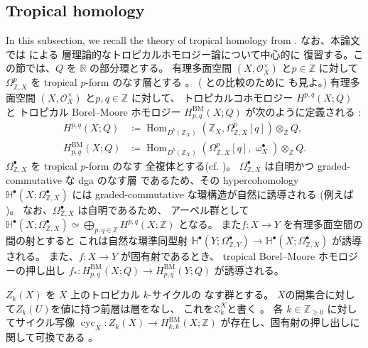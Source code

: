 \documentclass[a4paper,dvipdfmx,reqno,12pt]{amsart}
\theoremstyle{definition}
\newcommand{\deq}{\coloneqq}
\newcommand{\opn}[1]{\operatorname{#1}}
\numberwithin{equation}{section}
\begin{document}
\subsection{Tropical homology}
In this subsection, we recall
the theory of tropical homology from
\cite{MR3330789,MR3894860,MR4637248}.
なお、本論文では \cite{MR4637248} による
層理論的なトロピカルホモロジー論について中心的に
復習する。この節では、$Q$ を $\mathbb{R}$
の部分環とする。
有理多面空間 $(X,\mathcal{O}_X^{\times})$
と$p\in \mathbb{Z}$ に対して
$\Omega_{\mathbb{Z},X}^{p}$ を
tropical $p$-form のなす層とする
\cite[Definition 2.7]{MR4246795}。
(\cite{MR3330789,MR3961331} との比較のために 
\cite[Remark 2.8]{MR4637248} も見よ。)
有理多面空間 $(X,\mathcal{O}_X^{\times})$
と$p,q\in \mathbb{Z}$ に対して、
トロピカルコホモロジー $H^{p,q}(X;Q)$ と
トロピカル Borel--Moore ホモロジー
$H_{p,q}^{\mathrm{BM}}(X;Q)$ が次のように定義される
\cite[Definition 4.3]{MR4637248}:
\begin{align}
H^{p,q}(X;Q)&\deq \opn{Hom}_{D^{b}(\mathbb{Z}_X)}(
\mathbb{Z}_X,\Omega_{\mathbb{Z},X}^{p}[q])
\otimes_{\mathbb{Z}} Q, \\
H_{p,q}^{\mathrm{BM}}(X;Q)
&\deq \opn{Hom}_{D^{b}(\mathbb{Z}_X)}
(\Omega_{\mathbb{Z},X}^{p}[q],\upomega_{X}^{\bullet})
\otimes_{\mathbb{Z}}Q.
\end{align}
$\Omega_{\mathbb{Z},X}^{\bullet}$ 
を tropical $p$-form のなす
全複体とする(cf. \cite[Proposition 3.1]{smacka2017differential})。
$\Omega_{\mathbb{Z},X}^{\bullet}$ は自明かつ
graded-commutative な dga のなす層
であるため、その hypercohomology 
$\mathbb{H}^{\bullet}(X;\Omega_{\mathbb{Z},X}^{\bullet})$
には
graded-commutative な環構造が自然に誘導される
(例えば \cite[Remark 21.130]{gortzwedhorn2023})。 
なお、$\Omega_{\mathbb{Z},X}^{\bullet}$ は自明であるため、
アーベル群として
$\mathbb{H}^{\bullet}(X;\Omega_{\mathbb{Z},X}^{\bullet})
\simeq \bigoplus_{p,q\in \mathbb{Z}}
H^{p,q}(X;\mathbb{Z})$ となる。
また$f\colon X\to Y$ を有理多面空間の間の射とすると
これは自然な環準同型射 
$\mathbb{H}^{\bullet}(Y;\Omega_{\mathbb{Z},Y}^{\bullet})
\to \mathbb{H}^{\bullet}(X;\Omega_{\mathbb{Z},X}^{\bullet})$
が誘導される\cite[Proposition 4.18]{MR4637248}。
また、$f\colon X\to Y$ が固有射であるとき、
tropical Borel--Moore ホモロジーの押し出し
$f_*\colon H^{\opn{BM}}_{p,q}(X;Q)\to 
H^{\opn{BM}}_{p,q}(Y;Q)$ が誘導される。

$Z_k(X)$ を $X$ 上のトロピカル $k$-サイクルの
なす群とする\cite[Definition 3.5]{MR4637248}。
$X$の開集合に対して$Z_k(U)$を値に持つ前層は層をなし、
これを$\mathscr{Z}_k^{X}$と書く
\cite[p.591]{MR4637248}。
各 $k\in \mathbb{Z}_{\geq 0}$ に対してサイクル写像
$\opn{cyc}_X \colon Z_k(X)\to 
H^{\mathrm{BM}}_{k,k}(X;\mathbb{Z})$
が存在し、固有射の押し出しに関して可換である
\cite[Definition 5.4 and Corollary 5.8]{MR4637248}。
\end{document}
